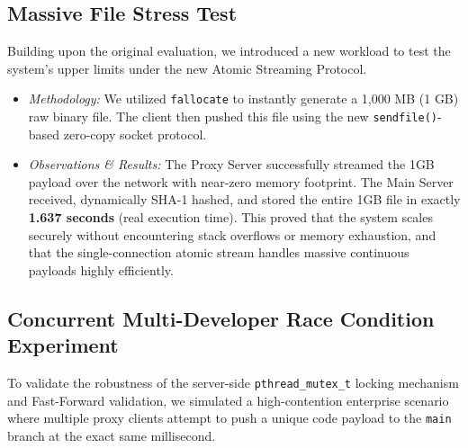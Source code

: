 \documentclass[12pt,a4paper]{article}
\begin{document}
\subsection{Massive File Stress Test}
Building upon the original evaluation, we introduced a new workload to test the system's upper limits under the new Atomic Streaming Protocol.
\begin{itemize}
    \item \textit{Methodology:} We utilized \texttt{fallocate} to instantly generate a 1,000 MB (1 GB) raw binary file. The client then pushed this file using the new \texttt{sendfile()}-based zero-copy socket protocol.
    \item \textit{Observations \& Results:} The Proxy Server successfully streamed the 1GB payload over the network with near-zero memory footprint. The Main Server received, dynamically SHA-1 hashed, and stored the entire 1GB file in exactly \textbf{1.637 seconds} (real execution time). This proved that the system scales securely without encountering stack overflows or memory exhaustion, and that the single-connection atomic stream handles massive continuous payloads highly efficiently.
\end{itemize}

\subsection{Concurrent Multi-Developer Race Condition Experiment}
To validate the robustness of the server-side \texttt{pthread\_mutex\_t} locking mechanism and Fast-Forward validation, we simulated a high-contention enterprise scenario where multiple proxy clients attempt to push a unique code payload to the \texttt{main} branch at the exact same millisecond.
\end{document}
